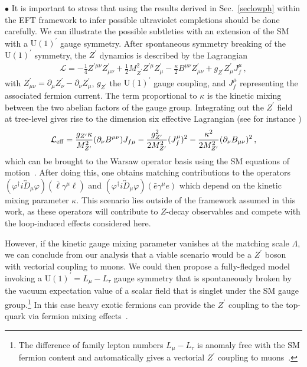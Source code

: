 \documentclass[aps,twocolumn,showpacs,preprintnumbers,amsmath,amssymb,floatfix,nofootinbib]{revtex4-1}
\begin{document}
$\bullet$ It is important to stress that using the results derived in Sec.~\ref{seclowph} within the EFT framework to infer possible ultraviolet completions should be done carefully.     We can illustrate the possible subtleties with an extension of the SM with a $\mathrm{U(1)}^{\prime}$ gauge symmetry.    After spontaneous symmetry breaking of the $\mathrm{U(1)}^{\prime}$ symmetry, the $Z^{\prime}$ dynamics is described by the Lagrangian
%
\begin{align}
\mathcal{L} = - \frac{1}{4}  Z^{\prime \mu \nu}  Z^{\prime}_{\mu \nu}   + \frac{1}{2}  M_{Z^{\prime}}^2  Z^{\prime \mu}  Z_{\mu}^{\prime}   -  \frac{\kappa}{2}  B^{\mu \nu}  Z^{\prime}_{\mu \nu}  +   g_{Z^{\prime}}   Z^{\prime}_{\mu}  J_f^{\mu} \,,
\end{align}
%
with $Z^{\prime}_{\mu \nu}  = \partial_{\mu}  Z^{\prime}_{\nu}  -  \partial_{\nu}  Z^{\prime}_{\mu}$, $g_{Z^{\prime}}$ the $\mathrm{U(1)}^{\prime}$ gauge coupling, and $J_f^{\mu}$ representing the associated fermion current.  The term proportional to $\kappa$ is the kinetic mixing between the two abelian factors of the gauge group.       Integrating out the $Z^{\prime}$ field at tree-level gives rise to the dimension six effective Lagrangian (see for instance \cite{Henning:2014wua})
%
\begin{align}
\mathcal{L}_{\rm{eff}}  =  \frac{ g_{Z^{\prime}}  \kappa  }{M_{Z^{\prime}}^2}  (\partial_{\nu}   B^{\mu \nu}  )   J_{f \mu}    -  \frac{ g_{Z^{\prime}}^2}{2  M_{Z^{\prime}}^2}  (J_{f}^{\mu})^2   - \frac{\kappa^2}{2 M_{Z^{\prime}}^2}  (  \partial_{\nu}   B_{\mu \nu} )^2   \,,
\end{align}
%
which can be brought to the Warsaw operator basis using the SM equations of motion~\cite{Grzadkowski:2010es}.    After doing this, one obtains matching contributions to the operators $(\varphi^{\dag}  i  \overleftrightarrow D_{\mu} \varphi ) (\bar \ell \gamma^{\mu}  \ell)$ and $(\varphi^{\dag}  i  \overleftrightarrow D_{\mu} \varphi ) (\bar e \gamma^{\mu}  e)$ which depend on the kinetic mixing parameter $\kappa$.   This scenario lies outside of the framework assumed in this work, as these operators will contribute to $Z$-decay observables and compete with the loop-induced effects considered here.  

However, if the kinetic gauge mixing parameter vanishes at the matching scale $\Lambda$, we can conclude from our analysis that a viable scenario would be a $Z^{\prime}$ boson with vectorial coupling to muons.   We could then propose a fully-fledged model invoking a $\mathrm{U(1)}^{\prime} = L_{\mu}-L_{\tau}$ gauge symmetry that is spontaneously broken by the vacuum expectation value of a scalar field that is singlet under the SM gauge group.\footnote{The difference of family lepton numbers $L_{\mu}-L_{\tau}$ is anomaly free with the SM fermion content and automatically gives a vectorial $Z^{\prime}$ coupling to muons~\cite{He:1990pn,He:1991qd}.    }     In this case heavy exotic fermions can provide the $Z^{\prime}$ coupling to the top-quark via fermion mixing effects~\cite{Kamenik:2017tnu}.    
\end{document}
